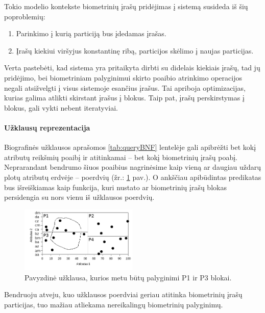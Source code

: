 Tokio modelio kontekste biometrinių įrašų pridėjimas į sistemą susideda iš šių poproblemių:
\begin{enumerate}
\item Parinkimo į kurią particiją bus įdedamas įrašas.
\item Įrašų kiekiui viršyjus konstantinę ribą, particijos skėlimo į naujas particijas.
\end{enumerate}

Verta pastebėti, kad sistema yra pritaikyta dirbti su didelais kiekiais įrašų, tad jų pridėjimo, bei biometriniam palyginimui skirto poaibio atrinkimo operacijos negali atsižvelgti į visus sistemoje esančius įrašus.
Tai apriboja optimizacijas, kurias galima atlikti skirstant įrašus į blokus.
Taip pat, įrašų perskirstymas į blokus, gali vykti nebent iteratyviai.


\paragraph{Užklausų reprezentacija}

Biografinės užklausos aprašomos \ref{tab:queryBNF} lentelėje gali apibrėžti bet kokį atributų reikšmių poaibį ir atitinkamai -- bet kokį biometrinių įrašų poabį.
Neprarandant bendrumo šiuos poaibius nagrinėsime kaip vieną ar daugiau uždarų plotų atributų erdvėje -- poerdvių (žr.: \ref{img:multidimensionalPartitionedGalleryWithQuery} pav.). %
O ankščiau apibūdintas predikatas bus išreiškiamas kaip funkcija, kuri nustato ar biometrinių įrašų blokas persidengia su nors vienu iš užklausos poerdvių.

\begin{figure}[H]
\begin{center}
\includegraphics[width=0.5\textwidth]{img/MultidimensionalPartitionedGalleryWithQuery.png}
\caption{Pavyzdinė užklausa, kurios metu būtų palyginimi P1 ir P3 blokai.}
\label{img:multidimensionalPartitionedGalleryWithQuery}
\end{center}
\end{figure}

Bendruoju atveju, kuo užklausos poerdviai geriau atitinka biometrinių įrašų particijas, tuo mažiau atliekama nereikalingų biometrinių palyginimų.

